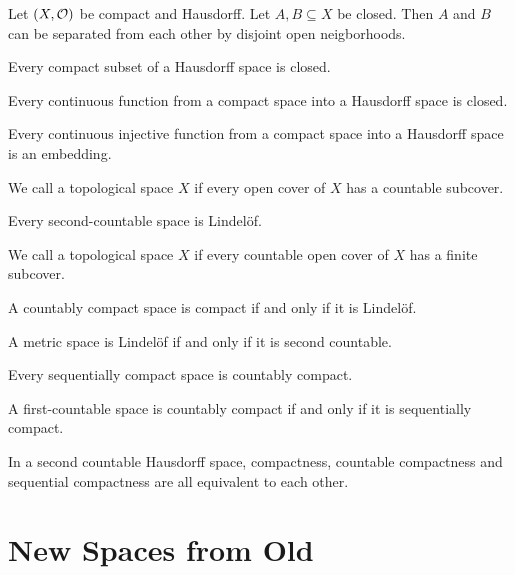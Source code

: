 \begin{exercise}
	Let $(X, \mathcal{O})$ be compact and Hausdorff. Let $A,B \subseteq X$ be closed. Then $A$ and $B$ can be separated from each other by disjoint open neigborhoods.
\end{exercise}
\begin{exercise}
	Every compact subset of a Hausdorff space is closed.
\end{exercise}
\begin{exercise}
	Every continuous function from a compact space into a Hausdorff space is closed.
\end{exercise}
\begin{exercise}
	Every continuous injective function from a compact space into a Hausdorff space is an embedding.
\end{exercise}
\begin{definition}
	We call a topological space $X$  if every open cover of $X$ has a countable subcover.
\end{definition}
\begin{theorem}
	Every second-countable space is Lindelöf.
\end{theorem}
\begin{definition}
	We call a topological space $X$  if every countable open cover of $X$ has a finite subcover.
\end{definition}
\begin{exercise}
	A countably compact space is compact if and only if it is Lindelöf.
\end{exercise}
\begin{theorem}
	A metric space is Lindelöf if and only if it is second countable.
\end{theorem}
\begin{theorem}
	Every sequentially compact space is countably compact.
\end{theorem}
\begin{theorem}
	A first-countable space is countably compact if and only if it is sequentially compact.
\end{theorem}
\begin{theorem}
	In a second countable Hausdorff space, compactness, countable compactness and sequential compactness are all equivalent to each other.
\end{theorem}

\clearpage

\chapter{New Spaces from Old}

